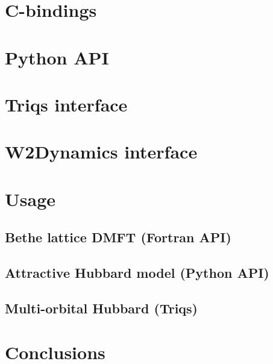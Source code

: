 \documentclass[final,3p,10pt]{elsarticle}
\begin{document}
\section{C-bindings}\label{SecCbind}

\section{Python API}

\section{Triqs interface}\label{SecEDI2Triqs}

\section{W2Dynamics interface}\label{SecEDI2W2Dyn}



\section{Usage}\label{SecUsage}
\subsection{Bethe lattice DMFT (Fortran API)}
\subsection{Attractive Hubbard model (Python API)}
\subsection{Multi-orbital Hubbard (Triqs)}














\section{Conclusions}
\end{document}
